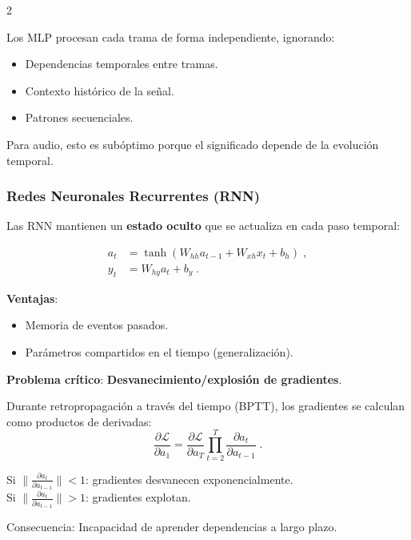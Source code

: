 \documentclass[12pt]{report}
\newenvironment{tightmulticols}{%
  \begin{multicols}{2}
  \setlength{\parskip}{1.2pt}
  \linespread{1}\selectfont
}{%
  \end{multicols}
}
\begin{document}
\begin{tightmulticols}
\noindent Los MLP procesan cada trama de forma independiente, ignorando:
\begin{itemize}
    \item Dependencias temporales entre tramas.
    \item Contexto histórico de la señal.
    \item Patrones secuenciales.
\end{itemize}

\noindent Para audio, esto es subóptimo porque el significado depende de la evolución temporal.

\subsubsection{Redes Neuronales Recurrentes (RNN)}

\noindent Las RNN mantienen un \textbf{estado oculto} que se actualiza en cada paso temporal:

\begin{align*}
    a_t &= \tanh(W_{hh}a_{t-1} + W_{xh}x_t + b_h) \; , \\[0.6ex]
    y_t &= W_{hy}a_t + b_y \; .
\end{align*}

\noindent \textbf{Ventajas}:
\begin{itemize}
    \item Memoria de eventos pasados.
    \item Parámetros compartidos en el tiempo (generalización).
\end{itemize}

\noindent \textbf{Problema crítico}: \textbf{Desvanecimiento/explosión de gradientes}.

\noindent Durante retropropagación a través del tiempo (BPTT), los gradientes se calculan como productos de derivadas:
\begin{equation*}
    \frac{\partial \mathcal{L}}{\partial a_1} = \frac{\partial \mathcal{L}}{\partial a_T} \prod_{t=2}^{T} \frac{\partial a_t}{\partial a_{t-1}} \; .
\end{equation*}

\noindent Si $\|\frac{\partial a_t}{\partial a_{t-1}}\| < 1$: gradientes desvanecen exponencialmente.\\

\noindent Si $\|\frac{\partial a_t}{\partial a_{t-1}}\| > 1$: gradientes explotan.\\

\par Consecuencia: Incapacidad de aprender dependencias a largo plazo.


\end{tightmulticols}
\end{document}
